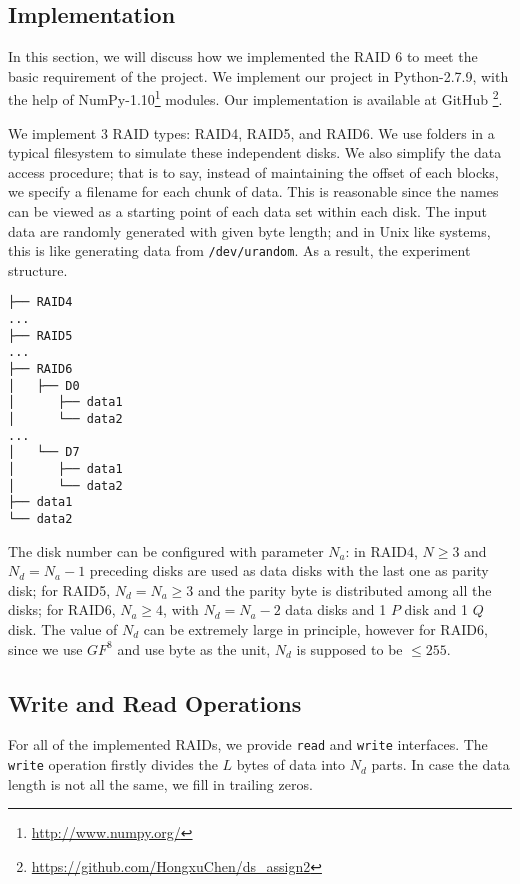 \subsection{Implementation}

In this section, we will discuss how we implemented the RAID 6 to meet the basic requirement of the project.
We implement our project in Python-2.7.9, with the help of NumPy-1.10\footnote{\url{http://www.numpy.org/}} modules. Our implementation is available at GitHub \footnote{\url{https://github.com/HongxuChen/ds_assign2}}.

We implement 3 RAID types: RAID4, RAID5, and RAID6. We use folders in a typical filesystem to simulate these independent disks. We also simplify the data access procedure; that is to say, instead of maintaining the offset of each blocks, we specify a filename for each chunk of data. This is reasonable since the names can be viewed as a starting point of each data set within each disk. The input data are randomly generated with given byte length; and in Unix like systems, this is like generating data from \verb|/dev/urandom|. As a result, the experiment structure.

\begin{verbatim}
├── RAID4
...
├── RAID5
...
├── RAID6
│   ├── D0
│      ├── data1
│      └── data2
...
│   └── D7
│      ├── data1
│      └── data2
├── data1
└── data2

\end{verbatim}

The disk number can be configured with parameter $N_{a}$: in RAID4, $N\ge 3$ and $N_{d}=N_{a}-1$ preceding disks are used as data disks with the last one as parity disk; for RAID5, $N_{d}=N_{a}\ge 3$ and the parity byte is distributed among all the disks;  for RAID6, $N_{a}\ge 4$, with $N_{d}=N_{a}-2$ data disks and 1 $P$ disk and 1 $Q$ disk. The value of $N_{d}$ can be extremely large in principle, however for RAID6, since we use $GF^8$ and use byte as the unit, $N_{d}$ is supposed to be $\le 255$.

\subsection{Write and Read Operations}

For all of the implemented RAIDs, we provide \verb|read| and \verb|write| interfaces. The \verb|write| operation firstly divides the $L$ bytes of data into $N_d$ parts. In case the data length is not all the same, we fill in trailing zeros. 

